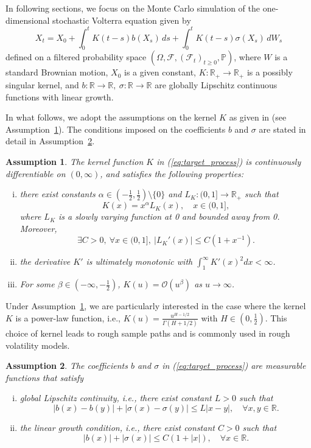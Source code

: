 \documentclass[11pt]{article}%
\newtheorem{assumption}{Assumption}
\theoremstyle{definition}
\begin{document}
In following sections, we focus on the Monte Carlo simulation of the one-dimensional stochastic Volterra equation given by 
\begin{equation}
    X_t = X_0 + \int_{0}^{t} K(t-s) b(X_s)\,ds + \int_{0}^{t} K(t-s)\sigma(X_s)\,dW_s\label{eq:target_process}
\end{equation}
defined on a filtered probability space \((\Omega,\mathcal{F},(\mathcal{F}_t)_{t\ge 0},\mathbb{P})\), where \(W\) is a standard Brownian motion, \(X_0\) is a given constant, \(K: \mathbb{R}_+ \to \mathbb{R}_+\) is a possibly singular kernel, and \(b: \mathbb{R}\to\mathbb{R},\ \sigma:\mathbb{R}\to\mathbb{R}\) are globally Lipschitz continuous functions with linear growth. 

In what follows, we adopt the assumptions on the kernel \(K\) as given in \cite{bennedsen_2017_FS} (see Assumption~\ref{assumption:kernel}). The conditions imposed on the coefficients \(b\) and \(\sigma\) are stated in detail in Assumption~\ref{assumption:coefficients}.

\begin{assumption}\label{assumption:kernel}
The kernel function \(K\) in (\ref{eq:target_process}) is continuously differentiable on \((0,\infty)\), and satisfies the following properties:
\begin{enumerate}[(i)]
    \item there exist constants \(\alpha\in(-\tfrac{1}{2},\tfrac{1}{2}) \setminus\{0\}\) and \(L_K: (0,1] \to \mathbb{R}_+\) such that \[K(x)=x^\alpha L_K(x),\quad x\in (0,1],\]
    where \(L_K\) is a slowly varying function at 0 and bounded away from 0. Moreover, 
    \[\exists C>0, \ \forall x \in (0,1],\ |L_K'(x)|\le C(1+x^{-1}).\]
    \item the derivative \(K'\) is ultimately monotonic with  \(\int_1^\infty K'(x)^2 dx < \infty\). 
    \item For some \(\beta \in (-\infty,-\tfrac{1}{2})\), \(K(u) = \mathcal{O}(u^\beta)\) as \(u\to \infty\).
\end{enumerate}
\end{assumption}

Under Assumption~\ref{assumption:kernel}, we are particularly interested in the case where the kernel \(K\) is a power-law function, i.e., \(K(u) = \tfrac{u^{H-1/2}}{\Gamma(H+1/2)}\) with \(H\in(0,\tfrac{1}{2})\). This choice of kernel leads to rough sample paths and is commonly used in rough volatility models.

\begin{assumption}\label{assumption:coefficients}
The coefficients \(b\) and \(\sigma\) in (\ref{eq:target_process}) are measurable functions that satisfy
\begin{enumerate}[(i)]
    \item global Lipschitz continuity, i.e., there exist constant \(L>0\) such that \[|b(x) - b(y)| + |\sigma(x) - \sigma(y)| \le L |x-y|,\quad \forall x,y\in\mathbb{R}.\]
    \item the linear growth condition,  i.e., there exist constant \(C>0\) such that
    \[
    |b(x)| + |\sigma(x)| \le C(1+|x|),\quad \forall x\in\mathbb{R}.
    \]
\end{enumerate}
\end{assumption}
\end{document}
